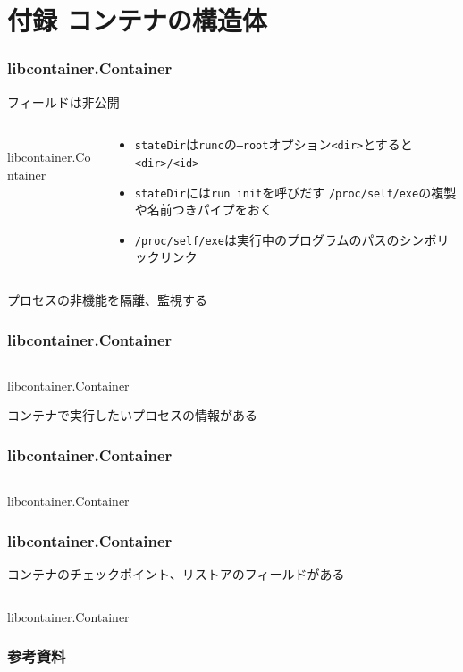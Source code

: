 \documentclass[unicode, 14pt, aspectratio=169]{beamer}
\begin{document}
\section{付録 コンテナの構造体}
\begin{frame}
  \frametitle{libcontainer.Container}
  フィールドは非公開
  \begin{columns}
    \begin{column}{0.5\textwidth}
      \begin{center}
        \inputminted{go}{code/container.go}
        libcontainer.Container\supercite{libcontainer}
      \end{center}
    \end{column}
    \begin{column}{0.5\textwidth}
      \begin{itemize}[leftmargin=0.2cm,label=$\circ$]
        \item \texttt{stateDir}は\texttt{runc}の\texttt{--root}オプション\texttt{<dir>}とすると\texttt{<dir>/<id>}
        \item \texttt{stateDir}には\texttt{run init}を呼びだす \texttt{/proc/self/exe}の複製や名前つきパイプをおく
        \item \texttt{/proc/self/exe}は実行中のプログラムのパスのシンボリックリンク
      \end{itemize}
    \end{column}
  \end{columns}
\end{frame}
\begin{frame}
  プロセスの非機能を隔離、監視\supercite{rdt}する
  \frametitle{libcontainer.Container}
  \begin{center}
    \inputminted{go}{code/container2.go}
    libcontainer.Container\supercite{libcontainer}
  \end{center}
\end{frame}
\begin{frame}
  コンテナで実行したいプロセスの情報がある
  \frametitle{libcontainer.Container}
  \begin{center}
    \inputminted{go}{code/container3.go}
    libcontainer.Container\supercite{libcontainer}
  \end{center}
\end{frame}
\begin{frame}[t]
  \frametitle{libcontainer.Container}
  コンテナのチェックポイント、リストアのフィールドがある\supercite{criu}
  \begin{center}
    \inputminted{go}{code/container4.go}
    libcontainer.Container\supercite{libcontainer}
  \end{center}
\end{frame}
\begin{frame}[allowframebreaks]
  \frametitle{参考資料}
  \printbibliography
  \nocite{*}
\end{frame}
\end{document}
